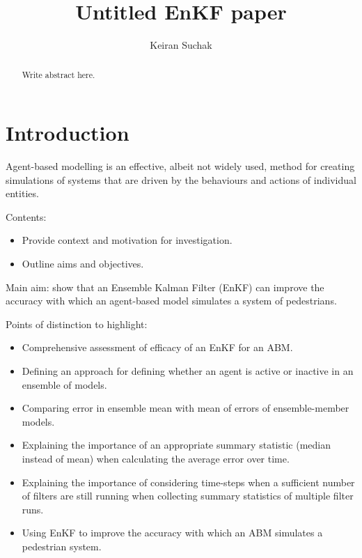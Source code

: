 \documentclass{article}
\title{Untitled EnKF paper}
\author{Keiran Suchak}
\begin{document}
\maketitle{}

\begin{abstract}
    Write abstract here.
\end{abstract}

\section{Introduction}\label{sec:intro}

Agent-based modelling is an effective, albeit not widely used, method for creating simulations of systems that are driven by the behaviours and actions of individual entities. 



Contents:
\begin{itemize}
    \item Provide context and motivation for investigation.
    \item Outline aims and objectives.
\end{itemize}

Main aim: show that an Ensemble Kalman Filter (EnKF) can improve the accuracy with which an agent-based model simulates a system of pedestrians.

Points of distinction to highlight:
\begin{itemize}
	\item Comprehensive assessment of efficacy of an EnKF for an ABM.
    \item Defining an approach for defining whether an agent is active or
        inactive in an ensemble of models.
    \item Comparing error in ensemble mean with mean of errors of
        ensemble-member models.
    \item Explaining the importance of an appropriate summary statistic
        (median instead of mean) when calculating the average error over
        time.
    \item Explaining the importance of considering time-steps when a
        sufficient number of filters are still running when collecting
        summary statistics of multiple filter runs.
    \item Using EnKF to improve the accuracy with which an ABM simulates a
        pedestrian system.
\end{itemize}
\end{document}
